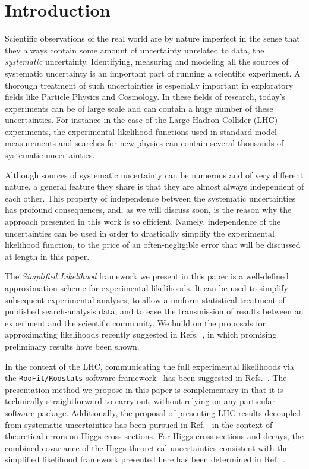 \documentclass[11pt]{article}
\begin{document}
\noindent
\newpage




\section{Introduction}


Scientific observations of the real world are by nature imperfect in the sense that they always contain some amount of
 uncertainty unrelated to data, the \textit{systematic}   uncertainty. Identifying, measuring and modeling all the sources of systematic uncertainty is an important part of running a scientific experiment. A thorough treatment of such uncertainties is especially important in exploratory fields like Particle Physics and Cosmology. In these fields of research,  %
today's experiments  can be of large scale and can contain a huge number of these  uncertainties. For instance in the case of the Large Hadron Collider (LHC) experiments, the experimental likelihood functions used in standard model measurements and searches for new physics can contain several thousands of systematic uncertainties.

Although sources of systematic uncertainty can be numerous and of very different nature, a general feature they share is that they are almost always independent of each other. This property of independence between the systematic uncertainties has profound consequences, and, as we will discuss soon, is the reason why the approach presented in this work is so efficient. Namely, independence of the uncertainties can be used in order to drastically simplify the experimental likelihood function, to the price of an often-negligible error that will be discussed at length in this paper.

The \textit{Simplified Likelihood} framework we present in this paper is a well-defined approximation scheme for experimental likelihoods. It can be used to simplify subsequent experimental analyses, to allow a uniform statistical treatment of published search-analysis data, and to ease the transmission of results between an experiment and the scientific community.
We build on the proposals for approximating likelihoods recently suggested in Refs.~\cite{Fichet:2016gvx,SL_note}, in which promising preliminary results have been shown.

In the context of the LHC, communicating the full experimental likelihoods via the \texttt{RooFit/Roostats} software framework~\cite{Verkerke:2003ir,Moneta:2010pm} has been suggested in Refs.~\cite{Kraml:2012sg,Boudjema:2013qla}. The presentation method we propose in this paper is complementary in that it is technically straightforward to carry out, without relying on any
particular software package. Additionally, the proposal of presenting LHC results decoupled from systematic uncertainties has been pursued in Ref.~\cite{Cranmer:2013hia} in the context of theoretical errors on Higgs cross-sections. For Higgs cross-sections and decays, the combined covariance of the Higgs theoretical uncertainties consistent with the simplified likelihood framework presented here has been determined in Ref.~\cite{Arbey:2016kqi}.
\end{document}
